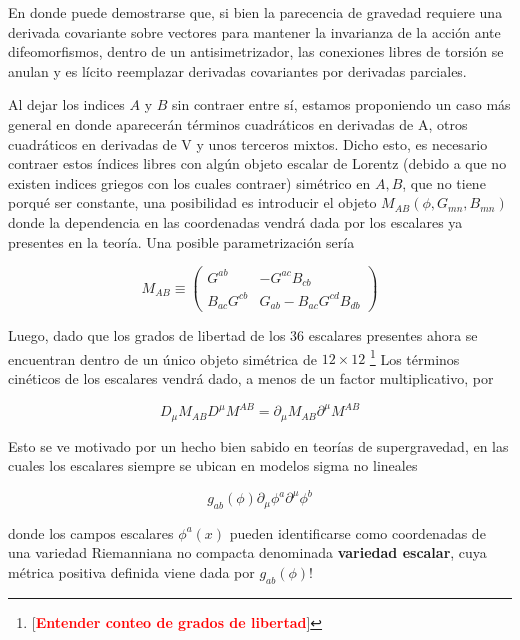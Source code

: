 \documentclass{article}
\numberwithin{equation}{section}
\begin{document}
En donde puede demostrarse que, si bien la parecencia de gravedad requiere una derivada covariante sobre vectores para mantener la invarianza de la acción ante difeomorfismos, dentro de un antisimetrizador, las conexiones libres de torsión se anulan y es lícito reemplazar derivadas covariantes por derivadas parciales.

Al dejar los indices $ A $ y $ B $ sin contraer entre sí, estamos proponiendo un caso más general en donde aparecerán términos cuadráticos en derivadas de A, otros cuadráticos en derivadas de V y unos terceros mixtos. Dicho esto, es necesario contraer estos índices libres con algún objeto escalar de Lorentz (debido a que no existen indices griegos con los cuales contraer) simétrico en $ A, B $, que no tiene porqué ser constante, una posibilidad es introducir el objeto $ M_{A B} (\phi,G_{m n}, B_{m n}) $ donde la dependencia en las coordenadas vendrá dada por los escalares ya presentes en la teoría. Una posible parametrización sería

\begin{equation}\label{M}
M_{A B} \equiv \begin{pmatrix}
G^{a b} & - G^{a c} B_{c b}\\
B_{a c} G^{c b} & G_{a b} - B_{a c} G^{c d} B_{d b}
\end{pmatrix}
\end{equation}


Luego, dado que los grados de libertad de los 36 escalares presentes ahora se encuentran dentro de un único objeto simétrica de $ 12 \times 12 $
\footnote{[\textcolor{red}{\textbf{Entender conteo de grados de libertad}}]}
Los términos cinéticos de los escalares vendrá dado, a menos de un factor multiplicativo, por

\begin{equation}
D_{\mu} M_{A B} D^{\mu} M^{A B} = \partial_{\mu} M_{A B} \partial^{\mu} M^{A B}
\end{equation} 

Esto se ve motivado por un hecho bien sabido en teorías de supergravedad, en las cuales los escalares siempre se ubican en modelos sigma no lineales

\begin{equation}
	g_{a b}(\phi) \partial_{\mu} \phi^a \partial^{\mu} \phi^b
\end{equation}

donde los campos escalares $ \phi^a(x) $ pueden identificarse como coordenadas de una variedad Riemanniana no compacta denominada \textbf{variedad escalar}, cuya métrica positiva definida viene dada por $ g_{a b} (\phi) $!
\end{document}
